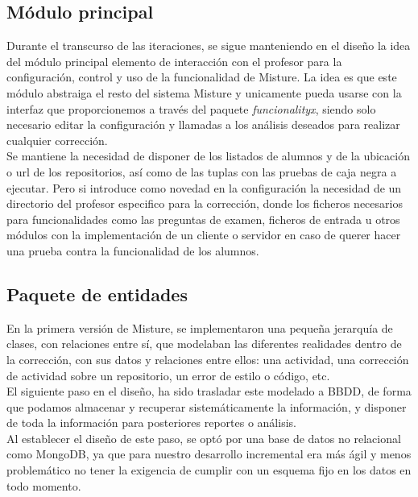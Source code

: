 \subsection{Módulo principal} 
\label{subsec:mod_principal}

Durante el transcurso de las iteraciones, se sigue manteniendo en el diseño la idea del módulo principal elemento de interacción con el profesor para la configuración, control y uso de la funcionalidad de Misture. La idea es que este módulo abstraiga el resto del sistema Misture y unicamente pueda usarse con la interfaz que proporcionemos a través del paquete \textit{funcionalityx}, siendo solo necesario editar la configuración y llamadas a los análisis deseados para realizar cualquier corrección.\\


Se mantiene la necesidad de disponer de los listados de alumnos y de la ubicación o url de los repositorios, así como de las tuplas con las pruebas de caja negra a ejecutar. Pero si introduce como novedad en la configuración la necesidad de un directorio del profesor especifico para la corrección, donde los ficheros necesarios para funcionalidades como las preguntas de examen, ficheros de entrada u otros módulos con la implementación de un cliente o servidor en caso de querer hacer una prueba contra la funcionalidad de los alumnos.

\subsection{Paquete de entidades} 
\label{subsec:paq_entities}

En la primera versión de Misture, se implementaron una pequeña jerarquía de clases, con relaciones entre sí, que modelaban las diferentes realidades dentro de la corrección, con sus datos y relaciones entre ellos: una actividad, una corrección de actividad sobre un repositorio, un error de estilo o código, etc.\\


El siguiente paso en el diseño, ha sido trasladar este modelado a BBDD, de forma que podamos almacenar y recuperar sistemáticamente la información, y disponer de toda la información para posteriores reportes o análisis.\\


Al establecer el diseño de este paso, se optó por una base de datos no relacional como MongoDB, ya que para nuestro desarrollo incremental era más ágil y menos problemático no tener la exigencia de cumplir con un esquema fijo en los datos en todo momento.\\


